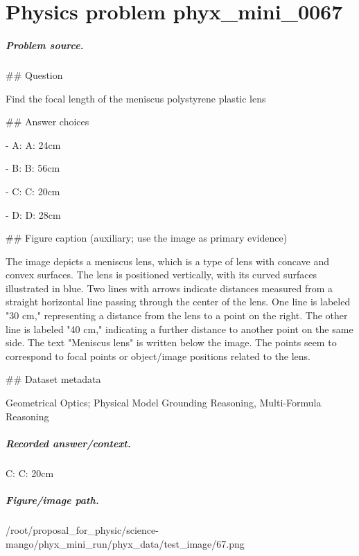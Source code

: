 
\chapter{Physics problem phyx\_mini\_0067}
\label{ch:PhyXMiniProblems_problem_phyx_mini_0067}

\paragraph{Problem source.}
\#\# Question

Find the focal length of the meniscus polystyrene plastic lens

\#\# Answer choices

- A: A: 24cm

- B: B: 56cm

- C: C: 20cm

- D: D: 28cm

\#\# Figure caption (auxiliary; use the image as primary evidence)

The image depicts a meniscus lens, which is a type of lens with concave and convex surfaces. The lens is positioned vertically, with its curved surfaces illustrated in blue. Two lines with arrows indicate distances measured from a straight horizontal line passing through the center of the lens. One line is labeled "30 cm," representing a distance from the lens to a point on the right. The other line is labeled "40 cm," indicating a further distance to another point on the same side. The text "Meniscus lens" is written below the image. The points seem to correspond to focal points or object/image positions related to the lens.

\#\# Dataset metadata

Geometrical Optics; Physical Model Grounding Reasoning, Multi-Formula Reasoning

\paragraph{Recorded answer/context.}
C: C: 20cm

\paragraph{Figure/image path.}
/root/proposal\_for\_physic/science-mango/phyx\_mini\_run/phyx\_data/test\_image/67.png


